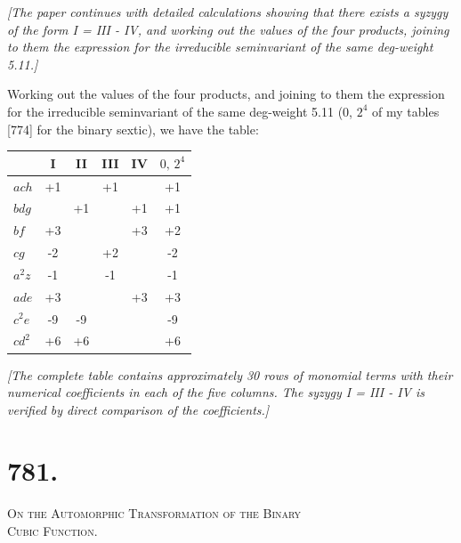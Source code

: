 \documentclass[11pt,a4paper]{book}
\begin{document}
\textit{[The paper continues with detailed calculations showing that there exists a syzygy of the form I = III - IV, and working out the values of the four products, joining to them the expression for the irreducible seminvariant of the same deg-weight 5.11.]}

Working out the values of the four products, and joining to them the expression for the irreducible seminvariant of the same deg-weight 5.11 (0, $2^{4}$ of my tables [774] for the binary sextic), we have the table:

\begin{center}
\begin{tabular}{|l|c|c|c|c|c|}
\hline
 & I & II & III & IV & $0,\, 2^{4}$ \\
\hline
$ach$ & +1 & & +1 & & +1 \\
$bdg$ & & +1 & & +1 & +1 \\
$bf$ & +3 & & & +3 & +2 \\
$cg$ & -2 & & +2 & & -2 \\
$a^{2}z$ & -1 & & -1 & & -1 \\
$ade$ & +3 & & & +3 & +3 \\
$c^{2}e$ & -9 & -9 & & & -9 \\
$cd^{2}$ & +6 & +6 & & & +6 \\
\hline
\end{tabular}
\end{center}

\textit{[The complete table contains approximately 30 rows of monomial terms with their numerical coefficients in each of the five columns. The syzygy I = III - IV is verified by direct comparison of the coefficients.]}

\newpage

\section*{781.}

\begin{center}
\Large\scshape On the Automorphic Transformation of the Binary\\Cubic Function.
\end{center}
\end{document}
